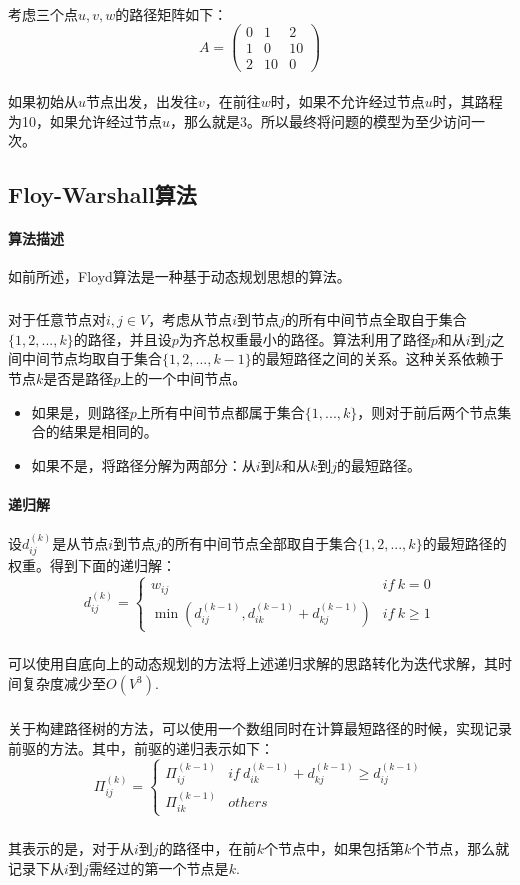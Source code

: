 \documentclass[UTF8,a4paper]{ctexart}
\begin{document}
\paragraph{}考虑三个点$u,v,w$的路径矩阵如下：
\[
    A=\begin{pmatrix}
        0 & 1  & 2  \\
        1 & 0  & 10 \\
        2 & 10 & 0
    \end{pmatrix}
\]
\paragraph{}如果初始从$u$节点出发，出发往$v$，在前往$w$时，如果不允许经过节点$u$时，其路程为10，如果允许经过节点$u$，那么就是3。所以最终将问题的模型为至少访问一次。

\subsection{Floy-Warshall算法}\label{sec:floydsolution}
\paragraph{算法描述}如前所述，Floyd算法是一种基于动态规划思想的算法。
\subparagraph{}对于任意节点对$i,j\in V$，考虑从节点$i$到节点$j$的所有中间节点全取自于集合$\{1,2,...,k\}$的路径，并且设$p$为齐总权重最小的路径。算法利用了路径$p$和从$i$到$j$之间中间节点均取自于集合$\{1,2,...,k-1\}$的最短路径之间的关系。这种关系依赖于节点$k$是否是路径$p$上的一个中间节点。
\begin{itemize}
    \item 如果是，则路径$p$上所有中间节点都属于集合$\{1,...,k\}$，则对于前后两个节点集合的结果是相同的。
    \item 如果不是，将路径分解为两部分：从$i$到$k$和从$k$到$j$的最短路径。
\end{itemize}
\paragraph{递归解}设$d_{ij}^{(k)}$是从节点$i$到节点$j$的所有中间节点全部取自于集合$\{1,2,...,k\}$的最短路径的权重。得到下面的递归解：
\[
    d_{ij}^{(k)}=\begin{cases}
        w_{ij}                                             & if~ k=0     \\
        \min(d_{ij}^{(k-1)},d_{ik}^{(k-1)}+d_{kj}^{(k-1)}) & if~ k\geq 1
    \end{cases}
\]
\subparagraph{}可以使用自底向上的动态规划的方法将上述递归求解的思路转化为迭代求解，其时间复杂度减少至$O(V^3)$.
\subparagraph{}关于构建路径树的方法，可以使用一个数组同时在计算最短路径的时候，实现记录前驱的方法。其中，前驱的递归表示如下：
\[
    \Pi_{ij}^{(k)}=\begin{cases}
        \Pi_{ij}^{(k-1)} & if~ d_{ik}^{(k-1)}+d_{kj}^{(k-1)} \geq d_{ij}^{(k-1)} \\
        \Pi_{ik}^{(k-1)} & others
    \end{cases}
\]
\subparagraph{}其表示的是，对于从$i$到$j$的路径中，在前$k$个节点中，如果包括第$k$个节点，那么就记录下从$i$到$j$需经过的第一个节点是$k$.
\end{document}
